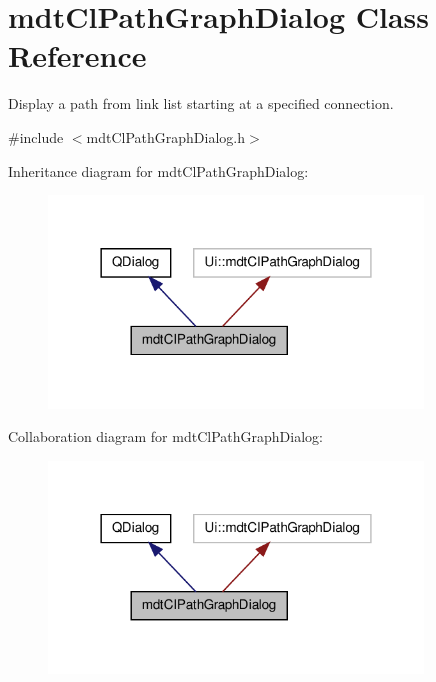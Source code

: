 \hypertarget{classmdt_cl_path_graph_dialog}{\section{mdt\-Cl\-Path\-Graph\-Dialog Class Reference}
\label{classmdt_cl_path_graph_dialog}
}


Display a path from link list starting at a specified connection.  




{\ttfamily \#include $<$mdt\-Cl\-Path\-Graph\-Dialog.\-h$>$}



Inheritance diagram for mdt\-Cl\-Path\-Graph\-Dialog\-:\nopagebreak
\begin{figure}[H]
\begin{center}
\leavevmode
\includegraphics[width=282pt]{classmdt_cl_path_graph_dialog__inherit__graph}
\end{center}
\end{figure}


Collaboration diagram for mdt\-Cl\-Path\-Graph\-Dialog\-:\nopagebreak
\begin{figure}[H]
\begin{center}
\leavevmode
\includegraphics[width=282pt]{classmdt_cl_path_graph_dialog__coll__graph}
\end{center}
\end{figure}
